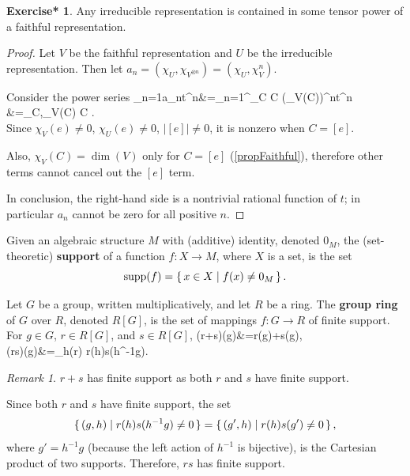 \documentclass[12pt, letterpaper]{article}
\newcommand{\supp}{\operatorname{supp}}
\newcommand{\card}[1]{\left\lvert #1 \right\rvert}
\newcommand{\conj}{\overline}
\newcommand{\ec}[1]{\left[{#1}\right]}
\newenvironment{eqlong}{\equation\aligned}{\endaligned\endequation}
\theoremstyle{definition}
\theoremstyle{remark}
\newtheorem*{rem*}{Remark}
\theoremstyle{definition}
\newtheorem{exe*}[exe]{Exercise*}
\theoremstyle{plain}
\numberwithin{equation}{section}
\begin{document}
	\begin{exe*}
		Any irreducible representation is contained in 
		some tensor power of a faithful representation.
	\end{exe*}
	\begin{proof}
		Let $V$ be the faithful representation and $U$ be the irreducible representation.
		Then let $a_n = (\chi_U,\chi_{V^{\otimes n}})=(\chi_U,\chi_{V}^n)$.
		
		Consider the power series
		\begin{eqlong}
			\sum_{n=1}a_nt^n&=\frac{1}{\card{G}}\sum_{n=1}^{\infty}\sum_C \card{C}\conj{\chi_U(C)}(\chi_V(C))^nt^n\\
			&=\frac{1}{\card{G}}\sum_{C,\chi_V(C)} \card{C}\conj{\chi_U(C)}\left[\frac{1}{1-\chi_V(C)t}-1\right].\\
		\end{eqlong}
		 Since $\chi_V(e)\ne 0$, $\chi_U(e) \ne 0$, $\card{\ec{e}}\ne 0$,
		 it is nonzero when $C=\ec{e}$.
		 
		 Also, $\chi_V(C) = \dim(V)$ only for $C = \ec{e}$ (\autoref{propFaithful}),
		 therefore other terms cannot cancel out the $\ec{e}$ term.
		 
		 In conclusion, the right-hand side is a nontrivial rational function of $t$;
		 in particular $a_n$ cannot be zero for all positive $n$.
	\end{proof}
	\begin{def*}[support]
		Given an algebraic structure $M$ with (additive) identity, denoted $0_M$,
		the (set-theoretic) \textbf{support} of a function $f\colon X\to M$, where $X$ is a set,
		is the set
		\[\supp(f)=\set{x\in X| f(x)\ne 0_M}.\]
	\end{def*}
	\begin{def*}
		Let $G$ be a group, written multiplicatively, and let $R$ be a ring. The \textbf{group ring} of $G$ over $R$,
		denoted $R[G]$, is the set of mappings $f \colon G \to R$ of finite support.
		For $g\in G$, $r\in R[G]$, and $s\in R[G]$,
		\begin{eqlong}
			(r+s)(g)&=r(g)+s(g),\\
			(rs)(g)&=\sum_{h\in \supp(r)} r(h)s(h^{-1}g).
		\end{eqlong}
	\end{def*}
	\begin{rem*}
		$r+s$ has finite support as both $r$ and $s$ have finite support.

		Since both $r$ and $s$ have finite support, the set
		\[ \set{(g,h)|r(h)s(h^{-1}g)\ne  0} = \set{(g',h)|r(h)s(g')\ne0}, \]
		where $g'=h^{-1}g$ (because the left action of $h^{-1}$ is bijective),
		is the Cartesian product of two supports.
		Therefore, $rs$ has finite support.
	\end{rem*}
\end{document}
